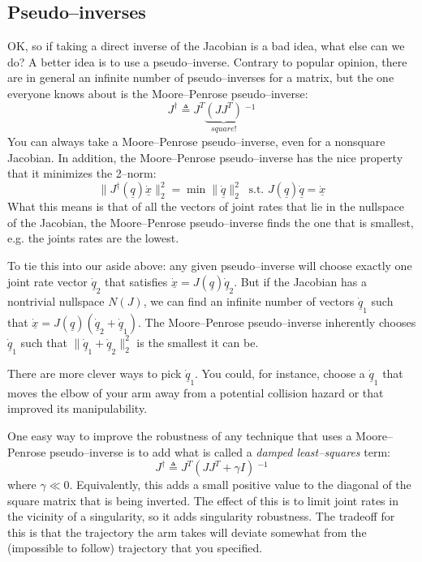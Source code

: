 \documentclass[]{article}
\begin{document}
\subsection{Pseudo--inverses} 
OK, so if taking a direct inverse of the Jacobian is a bad idea, what else can we do? A better idea is to use a pseudo--inverse. Contrary to popular opinion, there are in general an infinite number of pseudo--inverses for a matrix, but the one everyone knows about is the Moore--Penrose pseudo--inverse:
\begin{displaymath}
	J^{\dag} \triangleq J^{T}\underbrace{(JJ^{T})}_{square!}\ \!\!^{-1}
\end{displaymath}
You can always take a Moore--Penrose pseudo--inverse, even for a nonsquare Jacobian. In addition, the Moore--Penrose pseudo--inverse has the nice property that it minimizes the 2--norm:
\begin{displaymath}
	\| J^{\dag}(\underline{q})\dot{\underline{x}} \|_{2}^{2} = \min \| \dot{\underline{q}} \|_{2}^{2}\ \text{ s.t. } J(\underline{q})\dot{\underline{q}} = \dot{\underline{x}}
\end{displaymath}
What this means is that of all the vectors of joint rates that lie in the nullspace of the Jacobian, the Moore--Penrose pseudo--inverse finds the one that is smallest, e.g. the joints rates are the lowest.

To tie this into our aside above: any given pseudo--inverse will choose exactly one joint rate vector $\dot{\underline{q}}_{2}$ that satisfies $\dot{\underline{x}} = J(\underline{q})\dot{\underline{q}}_{2}$. But if the Jacobian has a nontrivial nullspace $N(J)$, we can find an infinite number of vectors $\dot{\underline{q}}_{1}$ such that $\dot{\underline{x}} = J(\underline{q})(\dot{\underline{q}}_{2} + \dot{\underline{q}}_{1})$. The Moore--Penrose pseudo--inverse inherently chooses $\dot{\underline{q}}_{1}$ such that  $\| \dot{\underline{q}}_{1} + \dot{\underline{q}}_{2} \|_{2}^{2}$ is the smallest it can be.

There are more clever ways to pick $\dot{\underline{q}}_{1}$. You could, for instance, choose a $\dot{\underline{q}}_{1}$ that moves the elbow of your arm away from a potential collision hazard or that improved its manipulability.

One easy way to improve the robustness of any technique that uses a Moore--Penrose pseudo--inverse is to add what is called a \textit{damped least--squares} term:
\begin{displaymath}
J^{\dag} \triangleq J^{T}(JJ^{T} + \gamma I)\ \!\!^{-1}
\end{displaymath}
where $\gamma \ll 0$. Equivalently, this adds a small positive value to the diagonal of the square matrix that is being inverted. The effect of this is to limit joint rates in the vicinity of a singularity, so it adds singularity robustness. The tradeoff for this is that the trajectory the arm takes will deviate somewhat from the (impossible to follow) trajectory that you specified.
\end{document}
